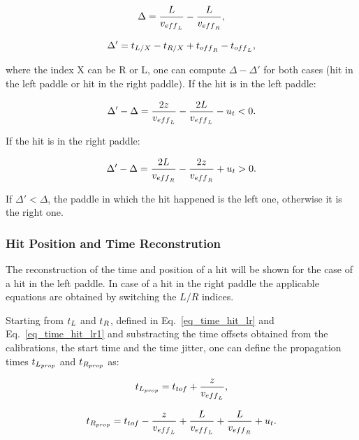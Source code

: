 \documentclass{elsart}
\begin{document}
\begin{equation}
\Delta=\frac{L}{v_{\rm{eff}_L}}-\frac{L}{v_{\rm{eff}_{\rm{R}}}},
\end{equation}

\begin{equation}
\Delta'=t_{\rm{L}/{\rm{X}}}-t_{\rm{R}/{\rm{X}}}+t_{\rm{off}_{\rm{R}}}-t_{\rm{off}_{\rm{L}}},
\end{equation}

\noindent
where the index X can be R or L, one can compute $\Delta-\Delta'$ for both cases (hit in the left paddle or hit
in the right paddle). If the hit is in the left paddle:

\begin{equation}
\Delta'-\Delta= \frac{2z}{v_{\rm{eff}_L}} - \frac{2L}{v_{\rm{eff}_L}} -u_{\rm{t}} <0.
\end{equation}

\noindent
If the hit is in the right paddle:

\begin{equation}
\Delta'-\Delta= \frac{2L}{v_{\rm{eff}_{\rm{R}}}}-\frac{2z}{v_{\rm{eff}_{\rm{R}}}} +u_{\rm{t}} >0.
\end{equation}

\noindent
If $\Delta'<\Delta$, the paddle in which the hit happened is the left one, otherwise it is the right one.

\subsubsection{Hit Position and Time Reconstrution}

The reconstruction of the time and position of a hit will be shown for the case of a hit in the left paddle. In
case of a hit in the right paddle the applicable equations are obtained by switching the $L/R$ indices.

Starting from $t_{\rm{L}}$ and $t_{\rm{R}}$, defined in Eq.~\ref{eq_time_hit_lr} and Eq.~\ref{eq_time_hit_lr1}
and substracting the time offsets obtained from the calibrations, the start time and the time jitter, one can
define the propagation times $t_{\rm{L}_{\rm{prop}}}$ and $t_{\rm{R}_{\rm{prop}}}$ as:

\begin{equation}
t_{\rm{L}_{\rm{prop}}}=t_{\rm{tof}}+\frac{z}{v_{\rm{eff}_{\rm{L}}}},
\end{equation}

\begin{equation}
t_{\rm{R}_{\rm{prop}}}=t_{\rm{tof}}-\frac{z}{v_{\rm{eff}_{\rm{L}}}}+\frac{L}{v_{\rm{eff}_{\rm{L}}}}
+\frac{L}{v_{\rm{eff}_{\rm{R}}}}+u_{\rm{t}}.
\end{equation}
\end{document}
